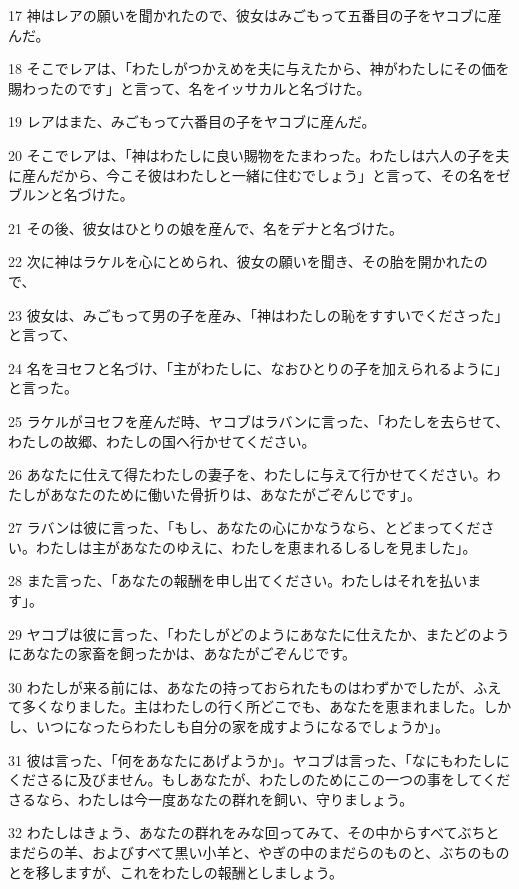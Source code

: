 \par 17 神はレアの願いを聞かれたので、彼女はみごもって五番目の子をヤコブに産んだ。
\par 18 そこでレアは、「わたしがつかえめを夫に与えたから、神がわたしにその価を賜わったのです」と言って、名をイッサカルと名づけた。
\par 19 レアはまた、みごもって六番目の子をヤコブに産んだ。
\par 20 そこでレアは、「神はわたしに良い賜物をたまわった。わたしは六人の子を夫に産んだから、今こそ彼はわたしと一緒に住むでしょう」と言って、その名をゼブルンと名づけた。
\par 21 その後、彼女はひとりの娘を産んで、名をデナと名づけた。
\par 22 次に神はラケルを心にとめられ、彼女の願いを聞き、その胎を開かれたので、
\par 23 彼女は、みごもって男の子を産み、「神はわたしの恥をすすいでくださった」と言って、
\par 24 名をヨセフと名づけ、「主がわたしに、なおひとりの子を加えられるように」と言った。
\par 25 ラケルがヨセフを産んだ時、ヤコブはラバンに言った、「わたしを去らせて、わたしの故郷、わたしの国へ行かせてください。
\par 26 あなたに仕えて得たわたしの妻子を、わたしに与えて行かせてください。わたしがあなたのために働いた骨折りは、あなたがごぞんじです」。
\par 27 ラバンは彼に言った、「もし、あなたの心にかなうなら、とどまってください。わたしは主があなたのゆえに、わたしを恵まれるしるしを見ました」。
\par 28 また言った、「あなたの報酬を申し出てください。わたしはそれを払います」。
\par 29 ヤコブは彼に言った、「わたしがどのようにあなたに仕えたか、またどのようにあなたの家畜を飼ったかは、あなたがごぞんじです。
\par 30 わたしが来る前には、あなたの持っておられたものはわずかでしたが、ふえて多くなりました。主はわたしの行く所どこでも、あなたを恵まれました。しかし、いつになったらわたしも自分の家を成すようになるでしょうか」。
\par 31 彼は言った、「何をあなたにあげようか」。ヤコブは言った、「なにもわたしにくださるに及びません。もしあなたが、わたしのためにこの一つの事をしてくださるなら、わたしは今一度あなたの群れを飼い、守りましょう。
\par 32 わたしはきょう、あなたの群れをみな回ってみて、その中からすべてぶちとまだらの羊、およびすべて黒い小羊と、やぎの中のまだらのものと、ぶちのものとを移しますが、これをわたしの報酬としましょう。
